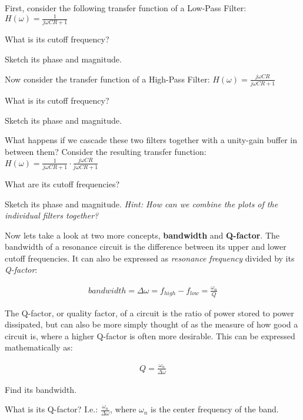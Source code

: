 
\begin{enumerate}

\qitem First, consider the following transfer function of a Low-Pass Filter: $H(\omega) = \frac{1}{j\omega CR + 1}$
    \begin{enumerate}
        \qitem What is its cutoff frequency?

        \qitem Sketch its phase and magnitude.

    \end{enumerate}

\qitem Now consider the transfer function of a High-Pass Filter: $H(\omega) = \frac{j\omega CR}{j\omega CR + 1}$
    \begin{enumerate}
        \qitem What is its cutoff frequency?

        \qitem Sketch its phase and magnitude.

    \end{enumerate}

\qitem What happens if we cascade these two filters together with a unity-gain buffer in between them? Consider the resulting transfer function: 
        $H(\omega) = \frac{1}{j\omega CR + 1} \cdot \frac{j\omega CR}{j\omega CR + 1}$
    \begin{enumerate}
        \qitem What are its cutoff frequencies?

        \qitem Sketch its phase and magnitude. \textit{Hint: How can we combine the plots of the individual filters together?}

    \end{enumerate}
Now lets take a look at two more concepts, \textbf{bandwidth} and \textbf{Q-factor}. The bandwidth of a resonance
circuit is the difference between its upper and lower cutoff frequencies. It can also be expressed as \textit{resonance frequency} divided by its \textit{Q-factor}:

\begin{align}
    bandwidth = \Delta \omega = f_{high} - f_{low} = \frac{\omega_n}{Q}
\end{align}

The Q-factor, or quality factor, of a circuit is the ratio of power stored to power dissipated, but can also be more simply thought of as the measure of how good a circuit is,
where a higher Q-factor is often more desirable. This can be expressed mathematically as:

\begin{align}
    Q = \frac{\omega_{n}}{\Delta \omega}
\end{align}

    \begin{enumerate}[resume]
        \qitem Find its bandwidth.

        \qitem What is its Q-factor? I.e.: $\frac{\omega_{n}}{\Delta \omega}$, where $\omega_{n}$ is the center frequency of the band.
        
    \end{enumerate}
\end{enumerate}
